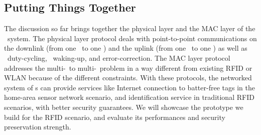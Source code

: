 \subsection{Putting Things Together}
The discussion so far brings together the physical layer and the MAC layer of the \vitag\ system. The physical layer protocol deals with point-to-point communications on the downlink (from one \reader\ to one \vitag) and the uplink (from one \vitag\ to one \reader) as well as \vitag\ duty-cycling, \vitag\ waking-up, and error-correction. The MAC layer protocol addresses the multi-\reader\ to multi-\vitag\ problem in a way different from existing RFID or WLAN because of the different constraints. With these protocols, the networked system of \vitag\/s can provide services like Internet connection to batter-free tags in the home-area sensor network scenario, and identification service in traditional RFID scenarios, with better security guarantees. We will showcase the prototype we build for the RFID scenario, and evaluate its performances and security preservation strength. 